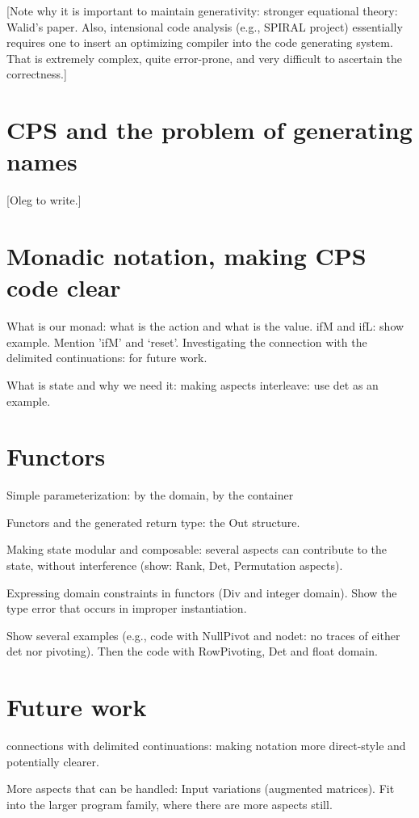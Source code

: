 \documentclass[11pt]{llncs}
\begin{document}
[Note why it is important to maintain generativity: stronger
equational theory: Walid's paper. Also, intensional code analysis
(e.g., SPIRAL project) essentially requires one to insert an
optimizing compiler into the code generating system. That is extremely
complex, quite error-prone, and very difficult to ascertain the
correctness.]

\section{CPS and the problem of generating names}

[Oleg to write.]

\section{Monadic notation, making CPS code clear}

What is our monad: what is the action and what is the value.
ifM and ifL: show example. Mention 'ifM' and `reset'. Investigating
the connection with the delimited continuations: for future work.

What is state and why we need it: making aspects interleave: use det
as an example.

\section{Functors}

Simple parameterization: by the domain, by the container
 
Functors and the generated return type: the Out structure.

Making state modular and composable: several aspects can contribute
to the state, without interference (show: Rank, Det, Permutation
aspects).

Expressing domain constraints in functors (Div and integer domain).
Show the type error that occurs in improper instantiation.

Show several examples (e.g., code with NullPivot and nodet: no traces
of either det nor pivoting). Then the code with RowPivoting, Det and
float domain. 

\section{Future work}
connections with delimited continuations: making notation
more direct-style and potentially clearer.

More aspects that can be handled: Input variations (augmented 
matrices).  Fit into the larger program family, where there are
more aspects still.

 

\end{document}
